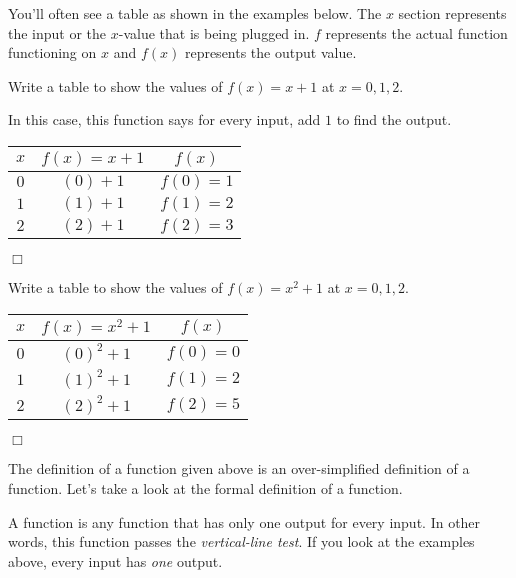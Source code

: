 \documentclass[../book.tex]{subfiles}
\begin{document}
You'll often see a table as shown in the examples below.  The $x$ section represents the input or the $x$-value that is being plugged in.  $f$ represents the actual function functioning on $x$ and $f(x)$ represents the output value.
\begin{example}
Write a table to show the values of $f(x)=x+1$ at $x=0,1,2$.
\end{example}
\begin{solution}
In this case, this function says for every input, add $1$ to find the output.
\begin{center}
\begin{tabular}{ |c|c|c| } 
 \hline
 $x$ & $f(x)=x+1$ & $f(x)$ \\ 
 \hline
 $0$ & $(0)+1$ & $f(0)=1$ \\ 
 $1$ & $(1)+1$ & $f(1)=2$ \\
 $2$ & $(2)+1$ & $f(2)=3$ \\
 \hline
\end{tabular}
\end{center}$\Box$
\end{solution}
\begin{example}
Write a table to show the values of $f(x)=x^2+1$ at $x=0,1,2$.
\end{example}
\begin{solution}
\begin{center}
\begin{tabular}{ |c|c|c| } 
 \hline
 $x$ & $f(x)=x^2+1$ & $f(x)$ \\ 
 \hline
 $0$ & $(0)^2+1$ & $f(0)=0$ \\ 
 $1$ & $(1)^2+1$ & $f(1)=2$ \\
 $2$ & $(2)^2+1$ & $f(2)=5$ \\
 \hline
\end{tabular}
\end{center}$\Box$
\end{solution}
\noindent The definition of a function given above is an over-simplified definition of a function.  Let's take a look at the formal definition of a function.

A function is any function that has only one output for every input.  In other words, this function passes the \textit{vertical-line test}.  If you look at the examples above, every input has \textit{one} output.  
\end{document}
